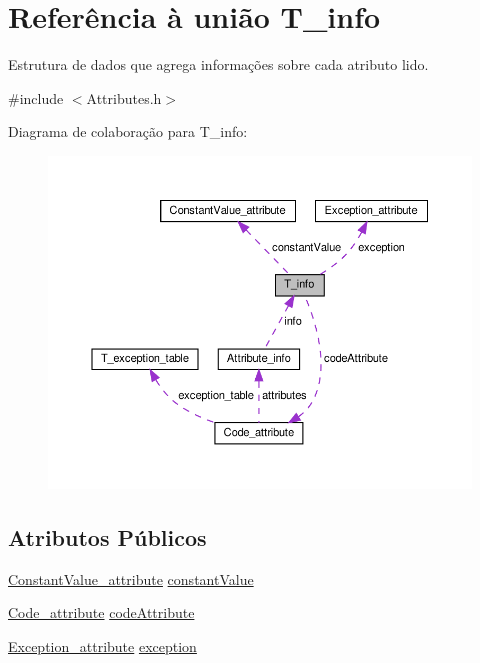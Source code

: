 \hypertarget{unionT__info}{}\section{Referência à união T\+\_\+info}
\label{unionT__info}


Estrutura de dados que agrega informações sobre cada atributo lido.  




{\ttfamily \#include $<$Attributes.\+h$>$}



Diagrama de colaboração para T\+\_\+info\+:
\nopagebreak
\begin{figure}[H]
\begin{center}
\leavevmode
\includegraphics[width=350pt]{unionT__info__coll__graph}
\end{center}
\end{figure}
\subsection*{Atributos Públicos}
\begin{DoxyCompactItemize}
\item 
\hyperlink{structConstantValue__attribute}{Constant\+Value\+\_\+attribute} \hyperlink{unionT__info_a523d69820ae3ef82c4e3bbfeb6fc3b84}{constant\+Value}
\item 
\hyperlink{structCode__attribute}{Code\+\_\+attribute} \hyperlink{unionT__info_a6924ca9d9e6afa44575f8a642d3b5612}{code\+Attribute}
\item 
\hyperlink{structException__attribute}{Exception\+\_\+attribute} \hyperlink{unionT__info_a68a6d821e7e97d1ef51c7601694f5a09}{exception}
\end{DoxyCompactItemize}


